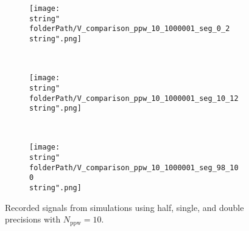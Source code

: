 

\renewcommand{\folderPath}{\string"./fig/1D_example/validate/dt_dx/comparison/plot_dt_h_10_9p997558593749999e-05_dt_h_30_9p997558593749999e-05_dt_h_50_9p997558593749999e-05/half_compensated_chop_D_3_chop_dt_dx_3_slow2sum_single_double/\string"}


\hspace{-0.05\textwidth}
\begin{minipage}[t]{.5\textwidth}
%
\begin{figure}[H]
\captionsetup{width=0.95\textwidth,font=footnotesize,labelfont=footnotesize}
\centering
%
\begin{subfigure}[b]{1\textwidth}
%
\centering\texttt{[image: \\string"\\folderPath/V\_comparison\_ppw\_10\_1000001\_seg\_0\_2\\string".png]}
%
\end{subfigure}\hfill
\\[2ex]
%
\begin{subfigure}[b]{1\textwidth}
%
\centering\texttt{[image: \\string"\\folderPath/V\_comparison\_ppw\_10\_1000001\_seg\_10\_12\\string".png]}
%
\end{subfigure}\hfill
\\[2ex]
%
\begin{subfigure}[b]{1\textwidth}
%
\centering\texttt{[image: \\string"\\folderPath/V\_comparison\_ppw\_10\_1000001\_seg\_98\_100\\string".png]}
%
\end{subfigure}\hfill
%
\caption{Recorded signals from simulations using half, single, and double precisions with $N_\text{ppw}=10$.}
\label{comparison_V_half_compensated_segments_ppw_10_slow2sum}
\end{figure}
%
\end{minipage}
%
\hfill %
%
